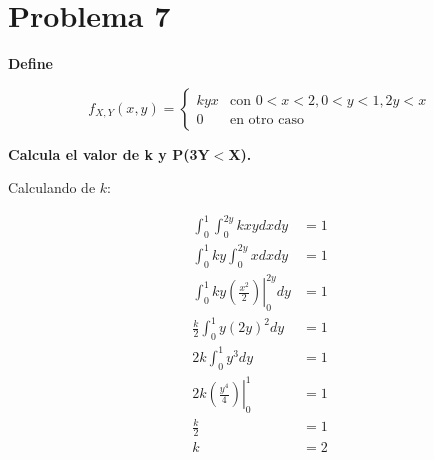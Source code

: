 \section*{Problema 7}

\textbf{Define}

\begin{equation*}
    f_{X,Y} (x,y) = \begin{cases}
        kyx & \text{con }0<x<2, 0<y<1, 2y<x \\
        0   & \text{en otro caso}
    \end{cases}
\end{equation*}

\textbf{Calcula el valor de k y P(3Y$<$X).}

Calculando de $k$:

\begin{align*}
    \int_0^1 \int_0^{2y} kxy dxdy                                 & = 1 \\
    \int_0^1 ky \int_0^{2y} xdx dy                                & = 1 \\
    \int_0^1 ky \left.\left(\frac{x^2}{2}\right)\right|_0^{2y} dy & = 1 \\
    \frac{k}{2}\int_0^1 y (2y)^2 dy                               & = 1 \\
    2k\int_0^1 y^3  dy                                            & = 1 \\
    2k \left.\left(\frac{y^4}{4}\right)\right|_0^1                & = 1 \\
    \frac{k}{2}                                                   & =1  \\
    k                                                             & = 2
\end{align*}